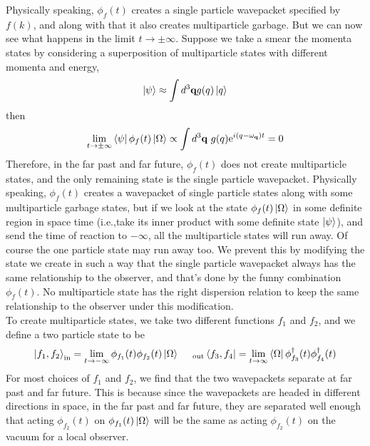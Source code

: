 \documentclass[11pt]{article}
\newcommand{\e}{\mathrm{e}}
\newcommand{\w}{\omega}
\numberwithin{equation}{section}
\begin{document}
Physically speaking, \(\phi_f(t)\) creates a single particle wavepacket specified by \(f(k)\), and along with that it also creates multiparticle garbage. But we can now see what happens in the limit \(t\to \pm \infty\). Suppose we take a smear the momenta states by considering a superposition of multiparticle states with different momenta and energy, 
\begin{equation*}
    \ket{\psi} \approx \int d^3\textbf{q} g(q) \ket{q}
\end{equation*}
then 
\begin{equation*}
    \lim_{t\to \pm\infty} \bra{\psi}\phi_f(t)\ket{\Omega} \propto \int d^3\textbf{q}~ g(q)\e^{i(q - \w_\textbf{q})t} = 0 
\end{equation*}
Therefore, in the far past and far future, \(\phi_f(t)\) does not create multiparticle states, and the only remaining state is the single particle wavepacket. Physically speaking, \(\phi_f(t)\) creates a wavepacket of single particle states along with some multiparticle garbage states, but if we look at the state \(\phi_f(t)\ket{\Omega}\) in some definite region in space time (i.e.,take its inner product with some definite state \(\ket\psi\)), and send the time of reaction to \(-\infty\), all the multiparticle states will run away. Of course the one particle state may run away too. We prevent this by modifying the state we create in such a way that the single particle wavepacket always has the same relationship to the observer, and that's done by the funny combination \(\phi_f(t)\). No multiparticle state has the right dispersion relation to keep the same relationship to the observer under this modification. \\

To create multiparticle states, we take two different functions \(f_1\) and \(f_2\), and we define a two particle state to be 
\begin{equation*}
    \ket{f_1, f_2}_{\text{in}} = \lim_{t\to -\infty} \phi_{f_1}(t)\phi_{f_2}(t) \ket{\Omega}~~~~{}_{\text{out}}\bra{f_3, f_4} = \lim_{t\to \infty} \bra{\Omega}\phi_{f_3}^\dagger(t)\phi^\dagger_{f_4}(t) 
\end{equation*}
For most choices of \(f_1\) and \(f_2\), we find that the two wavepackets separate at far past and far future. This is because since the wavepackets are headed in different directions in space, in the far past and far future, they are separated well enough that acting \(\phi_{f_2}(t)\) on \(\phi_{f_1}(t)\ket{\Omega}\) will be the same as acting \(\phi_{f_2}(t)\) on the vacuum for a local observer. \\
\end{document}
